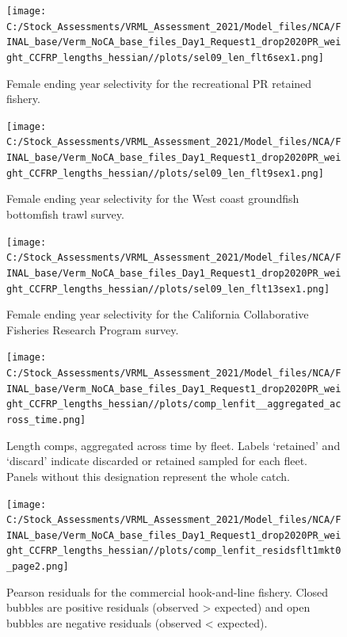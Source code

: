\documentclass[11pt,
  english,
]{article}
\begin{document}
\begin{figure}
\centering
\texttt{[image: C:/Stock\_Assessments/VRML\_Assessment\_2021/Model\_files/NCA/FINAL\_base/Verm\_NoCA\_base\_files\_Day1\_Request1\_drop2020PR\_weight\_CCFRP\_lengths\_hessian//plots/sel09\_len\_flt6sex1.png]}
\caption{Female ending year selectivity for the recreational PR retained fishery.\label{fig:endyr-selex-REC-PR}}
\end{figure}

\begin{figure}
\centering
\texttt{[image: C:/Stock\_Assessments/VRML\_Assessment\_2021/Model\_files/NCA/FINAL\_base/Verm\_NoCA\_base\_files\_Day1\_Request1\_drop2020PR\_weight\_CCFRP\_lengths\_hessian//plots/sel09\_len\_flt9sex1.png]}
\caption{Female ending year selectivity for the West coast groundfish bottomfish trawl survey.\label{fig:endyr-selex-NWFSC-TWL}}
\end{figure}

\begin{figure}
\centering
\texttt{[image: C:/Stock\_Assessments/VRML\_Assessment\_2021/Model\_files/NCA/FINAL\_base/Verm\_NoCA\_base\_files\_Day1\_Request1\_drop2020PR\_weight\_CCFRP\_lengths\_hessian//plots/sel09\_len\_flt13sex1.png]}
\caption{Female ending year selectivity for the California Collaborative Fisheries Research Program survey.\label{fig:endyr-selex-CCFRP}}
\end{figure}

\FloatBarrier

\FloatBarrier

\begin{figure}
\centering
\texttt{[image: C:/Stock\_Assessments/VRML\_Assessment\_2021/Model\_files/NCA/FINAL\_base/Verm\_NoCA\_base\_files\_Day1\_Request1\_drop2020PR\_weight\_CCFRP\_lengths\_hessian//plots/comp\_lenfit\_\_aggregated\_across\_time.png]}
\caption{Length comps, aggregated across time by fleet. Labels `retained' and `discard' indicate discarded or retained sampled for each fleet. Panels without this designation represent the whole catch.\label{fig:lenfits-all}}
\end{figure}

\FloatBarrier

\begin{figure}
\centering
\texttt{[image: C:/Stock\_Assessments/VRML\_Assessment\_2021/Model\_files/NCA/FINAL\_base/Verm\_NoCA\_base\_files\_Day1\_Request1\_drop2020PR\_weight\_CCFRP\_lengths\_hessian//plots/comp\_lenfit\_residsflt1mkt0\_page2.png]}
\caption{Pearson residuals for the commercial hook-and-line fishery. Closed bubbles are positive residuals (observed \textgreater{} expected) and open bubbles are negative residuals (observed \textless{} expected).\label{fig:len-pearson-COM-HKL}}
\end{figure}
\end{document}
